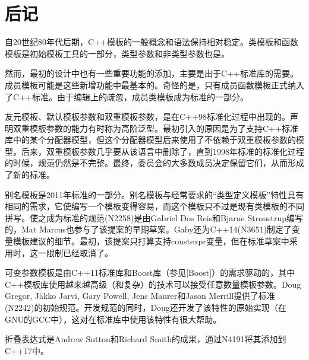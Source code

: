 \section{后记}
自20世纪80年代后期，C++模板的一般概念和语法保持相对稳定。类模板和函数模板是初始模板工具的一部分，类型参数和非类型参数也是。

然而，最初的设计中也有一些重要功能的添加，主要是出于C++标准库的需要。成员模板可能是这些新增功能中最基本的。奇怪的是，只有成员函数模板正式纳入了C++标准。由于编辑上的疏忽，成员类模板成为标准的一部分。

友元模板、默认模板参数和双重模板参数，是在C++98标准化过程中出现的。声明双重模板参数的能力有时称为高阶泛型。最初引入的原因是为了支持C++标准库中的某个分配器模型，但这个分配器模型后来使用了不依赖于双重模板参数的模型。后来，双重模板参数几乎要从该语言中删除了，直到1998年标准的标准化过程的时候，规范仍然是不完整。最终，委员会的大多数成员决定保留它们，从而形成了新的标准。

别名模板是2011年标准的一部分。别名模板与经常要求的“类型定义模板”特性具有相同的需求，它使编写一个模板变得容易，而这个模板只不过是现有类模板的不同拼写。使之成为标准的规范(N2258)是由Gabriel Dos Reis和Bjarne Stroustrup编写的，Mat Marcus也参与了该提案的早期草案。Gaby还为C++14(N3651)制定了变量模板建议的细节。最初，该提案只打算支持constexpr变量，但在标准草案中采用时，这一限制已经取消了。

可变参数模板是由C++11标准库和Boost库（参见[Boost]）的需求驱动的，其中C++模板库使用越来越高级（和复杂）的技术可以接受任意数量模板参数。Doug Gregor, J{\"a}kko Jarvi, Gary Powell, Jens Maurer和Jason Merrill提供了标准(N2242)的初始规范。开发规范的同时，Doug还开发了该特性的原始实现（在GNU的GCC中），这对在标准库中使用该特性有很大帮助。

折叠表达式是Andrew Sutton和Richard Smith的成果，通过N4191将其添加到C++17中。










